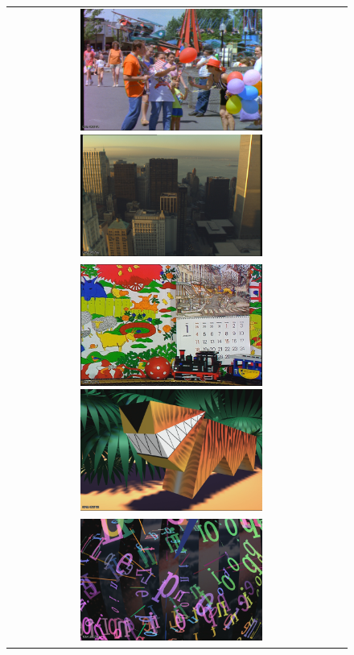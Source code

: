 \begin{figure}[p]
\centering
\begin{tabular}{c c}
    \includegraphics[height=4.0cm]{chapter4/frames/src13.png}
    \includegraphics[height=4.0cm]{chapter4/frames/src14.png}\\
    \includegraphics[height=4.0cm]{chapter4/frames/src15.png}
    \includegraphics[height=4.0cm]{chapter4/frames/src16.png}\\
    \includegraphics[height=4.0cm]{chapter4/frames/src17.png}

\end{tabular}
\end{figure}
